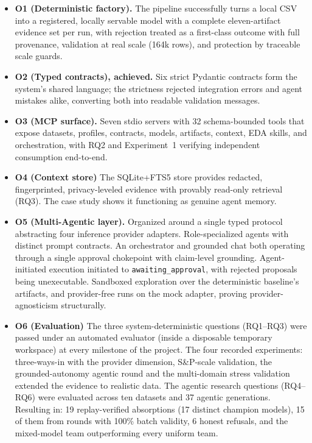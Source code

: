 \begin{itemize}
	\item \textbf{O1 (Deterministic factory).} The pipeline successfully turns a local CSV into a registered, locally servable model with a complete eleven-artifact evidence set per run, with rejection treated as a first-class outcome with full provenance, validation at real scale (164k rows), and protection by traceable scale guards.

	\item \textbf{O2 (Typed contracts), achieved.} Six strict Pydantic contracts form the system's shared language; the strictness rejected integration errors and agent mistakes alike, converting both into readable validation messages.

	\item \textbf{O3 (MCP surface).} Seven stdio servers with 32 schema-bounded tools that expose datasets, profiles, contracts, models, artifacts, context, EDA skills, and orchestration, with RQ2 and Experiment~1 verifying independent consumption end-to-end.

	\item \textbf{O4 (Context store)} The SQLite+FTS5 store provides redacted, fingerprinted, privacy-leveled evidence with provably read-only retrieval (RQ3). The case study shows it functioning as genuine agent memory.

	\item \textbf{O5 (Multi-Agentic layer).} Organized around a single typed protocol abstracting four inference provider adapters. Role-specialized agents with distinct prompt contracts. An orchestrator and grounded chat both operating through a single approval chokepoint with claim-level grounding. Agent-initiated execution initiated to \texttt{awaiting\_approval}, with rejected proposals being unexecutable. Sandboxed exploration over the deterministic baseline's artifacts, and provider-free runs on the mock adapter, proving provider-agnosticism structurally.

	\item \textbf{O6 (Evaluation)} The three system-deterministic questions (RQ1--RQ3) were passed under an automated evaluator (inside a disposable temporary workspace) at every milestone of the project. The four recorded experiments: three-ways-in with the provider dimension, S\&P-scale validation, the grounded-autonomy agentic round and the multi-domain stress validation extended the evidence to realistic data. The agentic research questions (RQ4--RQ6) were evaluated across ten datasets and 37 agentic generations. Resulting in: 19 replay-verified absorptions (17 distinct champion models), 15 of them from rounds with 100\% batch validity, 6 honest refusals, and the mixed-model team outperforming every uniform team.
\end{itemize}

